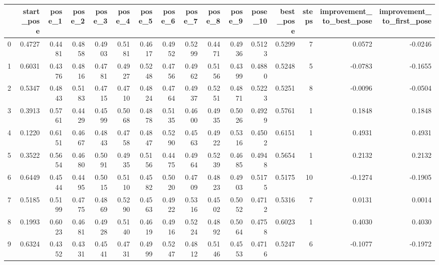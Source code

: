 \begin{tabular}{lrrrrrrrrrrrrrrr}
\toprule
{} &  start\_pose &  pose\_1 &  pose\_2 &  pose\_3 &  pose\_4 &  pose\_5 &  pose\_6 &  pose\_7 &  pose\_8 &  pose\_9 &  pose\_10 &  best\_pose &  steps &  improvement\_to\_best\_pose &  improvement\_to\_first\_pose \\
\midrule
0  &      0.4727 &  0.4481 &  0.4858 &  0.4903 &  0.5181 &  0.4617 &  0.4952 &  0.5299 &  0.4471 &  0.4936 &   0.5123 &     0.5299 &      7 &                    0.0572 &                    -0.0246 \\
1  &      0.6031 &  0.4376 &  0.4816 &  0.4781 &  0.4927 &  0.5248 &  0.4756 &  0.4962 &  0.5156 &  0.4399 &   0.4880 &     0.5248 &      5 &                   -0.0783 &                    -0.1655 \\
2  &      0.5347 &  0.4843 &  0.5183 &  0.4715 &  0.4710 &  0.4824 &  0.4764 &  0.4937 &  0.5251 &  0.4871 &   0.5223 &     0.5251 &      8 &                   -0.0096 &                    -0.0504 \\
3  &      0.3913 &  0.5761 &  0.4429 &  0.4599 &  0.5068 &  0.4878 &  0.5135 &  0.4600 &  0.4935 &  0.5026 &   0.4929 &     0.5761 &      1 &                    0.1848 &                     0.1848 \\
4  &      0.1220 &  0.6151 &  0.4667 &  0.4843 &  0.4758 &  0.4847 &  0.5290 &  0.4563 &  0.4922 &  0.5316 &   0.4502 &     0.6151 &      1 &                    0.4931 &                     0.4931 \\
5  &      0.3522 &  0.5654 &  0.4680 &  0.5091 &  0.4935 &  0.5156 &  0.4475 &  0.4964 &  0.5239 &  0.4685 &   0.4948 &     0.5654 &      1 &                    0.2132 &                     0.2132 \\
6  &      0.6449 &  0.4544 &  0.4495 &  0.5015 &  0.5110 &  0.4582 &  0.5020 &  0.4709 &  0.4823 &  0.4903 &   0.5175 &     0.5175 &     10 &                   -0.1274 &                    -0.1905 \\
7  &      0.5185 &  0.5199 &  0.4775 &  0.4869 &  0.5290 &  0.4563 &  0.4922 &  0.5316 &  0.4502 &  0.5052 &   0.4712 &     0.5316 &      7 &                    0.0131 &                     0.0014 \\
8  &      0.1993 &  0.6023 &  0.4681 &  0.4928 &  0.5140 &  0.4619 &  0.4916 &  0.5224 &  0.4892 &  0.5064 &   0.4758 &     0.6023 &      1 &                    0.4030 &                     0.4030 \\
9  &      0.6324 &  0.4352 &  0.4331 &  0.4541 &  0.4731 &  0.4999 &  0.5247 &  0.4812 &  0.5146 &  0.4553 &   0.4716 &     0.5247 &      6 &                   -0.1077 &                    -0.1972 \\

\end{tabular}
